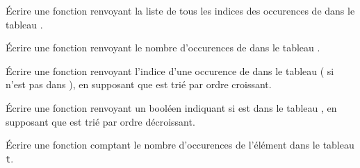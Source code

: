   \'Ecrire une fonction  renvoyant la liste de tous les indices des occurences de  dans le tableau .

  Écrire une fonction  renvoyant le nombre d'occurences de  dans le tableau .

  \'Ecrire une fonction  renvoyant l'indice d'une occurence de  dans le tableau  ( si  n'est pas dans ), en supposant que  est trié par ordre croissant.


  \'Ecrire une fonction  renvoyant un booléen indiquant si  est dans le tableau , en supposant que  est trié par ordre décroissant.

  Écrire une fonction  comptant le nombre d'occurences de l'élément  dans le tableau \texttt{t}.

